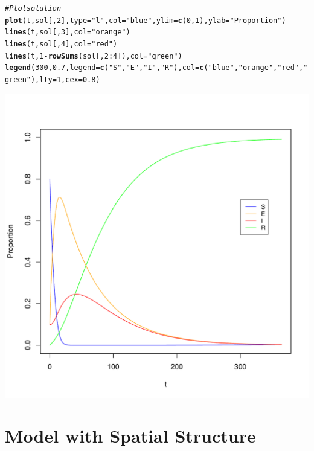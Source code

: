 \documentclass{article}\usepackage[]{graphicx}\usepackage[]{color}
\makeatletter
\def\maxwidth{ %
  \ifdim\Gin@nat@width>\linewidth
    \linewidth
  \else
    \Gin@nat@width
  \fi
}
\newcommand{\hlnum}[1]{\textcolor[rgb]{0.686,0.059,0.569}{#1}}%
\newcommand{\hlstr}[1]{\textcolor[rgb]{0.192,0.494,0.8}{#1}}%
\newcommand{\hlcom}[1]{\textcolor[rgb]{0.678,0.584,0.686}{\textit{#1}}}%
\newcommand{\hlopt}[1]{\textcolor[rgb]{0,0,0}{#1}}%
\newcommand{\hlstd}[1]{\textcolor[rgb]{0.345,0.345,0.345}{#1}}%
\newcommand{\hlkwc}[1]{\textcolor[rgb]{0.333,0.667,0.333}{#1}}%
\newcommand{\hlkwd}[1]{\textcolor[rgb]{0.737,0.353,0.396}{\textbf{#1}}}%
\newenvironment{kframe}{%
 \def\at@end@of@kframe{}%
 \ifinner\ifhmode%
  \def\at@end@of@kframe{\end{minipage}}%
  \begin{minipage}{\columnwidth}%
 \fi\fi%
 \def\FrameCommand##1{\hskip\@totalleftmargin \hskip-\fboxsep
 \colorbox{shadecolor}{##1}\hskip-\fboxsep
     \hskip-\linewidth \hskip-\@totalleftmargin \hskip\columnwidth}%
 \MakeFramed {\advance\hsize-\width
   \@totalleftmargin\z@ \linewidth\hsize
   \@setminipage}}%
 {\par\unskip\endMakeFramed%
 \at@end@of@kframe}
\newenvironment{knitrout}{}{} %
\makeatother
\begin{document}
\begin{knitrout}
\begin{kframe}
\begin{alltt}
\hlcom{# Plot solution}
\hlkwd{plot}\hlstd{(t,sol[,}\hlnum{2}\hlstd{],}\hlkwc{type}\hlstd{=}\hlstr{"l"}\hlstd{,}\hlkwc{col}\hlstd{=}\hlstr{"blue"}\hlstd{,}\hlkwc{ylim}\hlstd{=}\hlkwd{c}\hlstd{(}\hlnum{0}\hlstd{,}\hlnum{1}\hlstd{),}\hlkwc{ylab}\hlstd{=}\hlstr{"Proportion"}\hlstd{)}
\hlkwd{lines}\hlstd{(t,sol[,}\hlnum{3}\hlstd{],}\hlkwc{col}\hlstd{=}\hlstr{"orange"}\hlstd{)}
\hlkwd{lines}\hlstd{(t,sol[,}\hlnum{4}\hlstd{],}\hlkwc{col}\hlstd{=}\hlstr{"red"}\hlstd{)}
\hlkwd{lines}\hlstd{(t,}\hlnum{1}\hlopt{-}\hlkwd{rowSums}\hlstd{(sol[,}\hlnum{2}\hlopt{:}\hlnum{4}\hlstd{]),}\hlkwc{col}\hlstd{=}\hlstr{"green"}\hlstd{)}
\hlkwd{legend}\hlstd{(}\hlnum{300}\hlstd{,}\hlnum{0.7}\hlstd{,}\hlkwc{legend}\hlstd{=}\hlkwd{c}\hlstd{(}\hlstr{"S"}\hlstd{,}\hlstr{"E"}\hlstd{,}\hlstr{"I"}\hlstd{,}\hlstr{"R"}\hlstd{),}\hlkwc{col}\hlstd{=}\hlkwd{c}\hlstd{(}\hlstr{"blue"}\hlstd{,}\hlstr{"orange"}\hlstd{,}\hlstr{"red"}\hlstd{,}\hlstr{"green"}\hlstd{),} \hlkwc{lty}\hlstd{=}\hlnum{1}\hlstd{,} \hlkwc{cex}\hlstd{=}\hlnum{0.8}\hlstd{)}
\end{alltt}
\end{kframe}
\includegraphics[width=\maxwidth]{figure/unnamed-chunk-5-1} 

\end{knitrout}


\section{Model with Spatial Structure}
\end{document}
